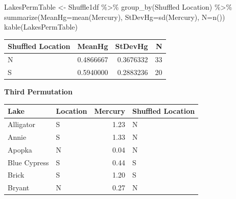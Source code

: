 \documentclass[
  letterpaper,
  DIV=11,
  numbers=noendperiod]{scrreprt}
\newenvironment{Shaded}{\begin{snugshade}}{\end{snugshade}}
\newcommand{\AttributeTok}[1]{\textcolor[rgb]{0.40,0.45,0.13}{#1}}
\newcommand{\DecValTok}[1]{\textcolor[rgb]{0.68,0.00,0.00}{#1}}
\newcommand{\DocumentationTok}[1]{\textcolor[rgb]{0.37,0.37,0.37}{\textit{#1}}}
\newcommand{\FunctionTok}[1]{\textcolor[rgb]{0.28,0.35,0.67}{#1}}
\newcommand{\NormalTok}[1]{\textcolor[rgb]{0.00,0.23,0.31}{#1}}
\newcommand{\OtherTok}[1]{\textcolor[rgb]{0.00,0.23,0.31}{#1}}
\newcommand{\SpecialCharTok}[1]{\textcolor[rgb]{0.37,0.37,0.37}{#1}}
\newcommand{\StringTok}[1]{\textcolor[rgb]{0.13,0.47,0.30}{#1}}
\begin{document}
\begin{Shaded}
\begin{Highlighting}[]
\NormalTok{LakesPermTable }\OtherTok{\textless{}{-}}\NormalTok{ Shuffle1df }\SpecialCharTok{\%\textgreater{}\%} \FunctionTok{group\_by}\NormalTok{(}\StringTok{\textasciigrave{}}\AttributeTok{Shuffled Location}\StringTok{\textasciigrave{}}\NormalTok{) }\SpecialCharTok{\%\textgreater{}\%} \FunctionTok{summarize}\NormalTok{(}\AttributeTok{MeanHg=}\FunctionTok{mean}\NormalTok{(Mercury), }\AttributeTok{StDevHg=}\FunctionTok{sd}\NormalTok{(Mercury),  }\AttributeTok{N=}\FunctionTok{n}\NormalTok{())}
\FunctionTok{kable}\NormalTok{(LakesPermTable)}
\end{Highlighting}
\end{Shaded}

\begin{longtable}[]{@{}lrrr@{}}
\toprule\noalign{}
Shuffled Location & MeanHg & StDevHg & N \\
\midrule\noalign{}
\endhead
\bottomrule\noalign{}
\endlastfoot
N & 0.4866667 & 0.3676332 & 33 \\
S & 0.5940000 & 0.2883236 & 20 \\
\end{longtable}

\textbf{Third Permutation}

\begin{Shaded}
\end{Shaded}

\begin{longtable}[]{@{}llrl@{}}
\toprule\noalign{}
Lake & Location & Mercury & Shuffled Location \\
\midrule\noalign{}
\endhead
\bottomrule\noalign{}
\endlastfoot
Alligator & S & 1.23 & N \\
Annie & S & 1.33 & N \\
Apopka & N & 0.04 & N \\
Blue Cypress & S & 0.44 & S \\
Brick & S & 1.20 & S \\
Bryant & N & 0.27 & N \\
\end{longtable}
\end{document}
